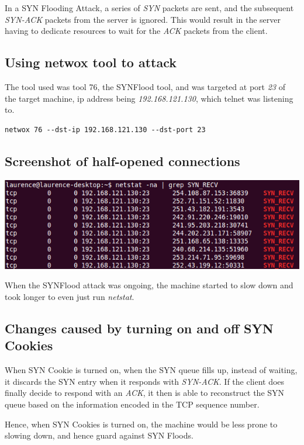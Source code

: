 \documentclass[12pt]{article}
\begin{document}
In a SYN Flooding Attack, a series of \emph{SYN} packets are sent, and the subsequent \emph{SYN-ACK} packets from the server is ignored. This would result in the server having to dedicate resources to wait for the \emph{ACK} packets from the client.\\

\subsection{Using netwox tool to attack}
The tool used was tool 76, the SYNFlood tool, and was targeted at port \emph{23} of the target machine, ip address being \emph{192.168.121.130}, which telnet was listening to.\\

\begin{lstlisting}
netwox 76 --dst-ip 192.168.121.130 --dst-port 23
\end{lstlisting}

\subsection{Screenshot of half-opened connections}
\includegraphics[width=160mm]{task21.png}

When the SYNFlood attack was ongoing, the machine started to slow down and took longer to even just run \emph{netstat}.\\

\subsection{Changes caused by turning on and off SYN Cookies}
When SYN Cookie is turned on, when the SYN queue fills up, instead of waiting, it discards the SYN entry when it responds with \emph{SYN-ACK}. If the client does finally decide to respond with an \emph{ACK}, it then is able to reconstruct the SYN queue based on the information encoded in the TCP sequence number.

Hence, when SYN Cookies is turned on, the machine would be less prone to slowing down, and hence guard against SYN Floods.
\pagebreak
\end{document}
